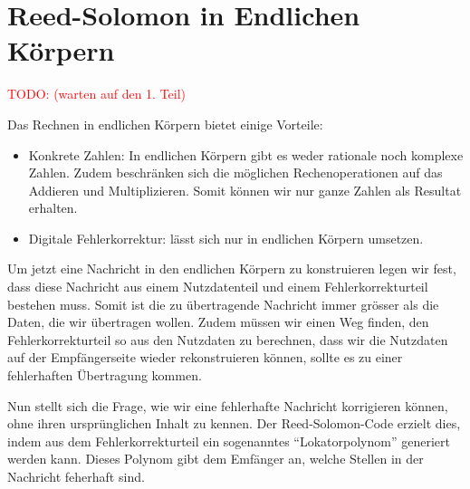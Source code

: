 %
%
%
\section{Reed-Solomon in Endlichen Körpern
\label{reedsolomon:section:endlichekoerper}}

\textcolor{red}{TODO: (warten auf den 1. Teil)}

Das Rechnen in endlichen Körpern bietet einige Vorteile:

\begin{itemize}
	\item Konkrete Zahlen: In endlichen Körpern gibt es weder rationale noch komplexe Zahlen. Zudem beschränken sich die möglichen Rechenoperationen auf das Addieren und Multiplizieren. Somit können wir nur ganze Zahlen als Resultat erhalten.
	
	\item Digitale Fehlerkorrektur: lässt sich nur in endlichen Körpern umsetzen. 
	
\end{itemize}

Um jetzt eine Nachricht in den endlichen Körpern zu konstruieren legen wir fest, dass diese Nachricht aus einem Nutzdatenteil und einem Fehlerkorrekturteil bestehen muss. Somit ist die zu übertragende Nachricht immer grösser als die Daten, die wir übertragen wollen. Zudem müssen wir einen Weg finden, den Fehlerkorrekturteil so aus den Nutzdaten zu berechnen, dass wir die Nutzdaten auf der Empfängerseite wieder rekonstruieren können, sollte es zu einer fehlerhaften Übertragung kommen.

Nun stellt sich die Frage, wie wir eine fehlerhafte Nachricht korrigieren können, ohne ihren ursprünglichen Inhalt zu kennen. Der Reed-Solomon-Code erzielt dies, indem aus dem Fehlerkorrekturteil ein sogenanntes ``Lokatorpolynom'' generiert werden kann. Dieses Polynom gibt dem Emfänger an, welche Stellen in der Nachricht feherhaft sind. 
